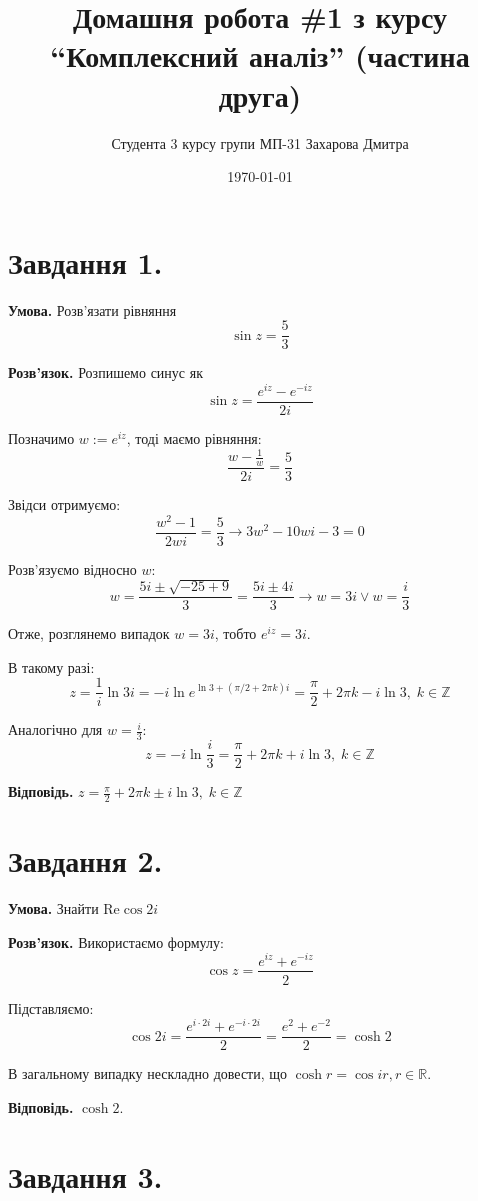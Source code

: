 \documentclass[12pt]{extarticle}
\title{Домашня робота \#1 з курсу ``Комплексний аналіз'' (частина друга)}
\author{Студента 3 курсу групи МП-31 Захарова Дмитра}
\date{\today}
\begin{document}
\maketitle

\section*{Завдання 1.} 

\textbf{Умова.} Розв'язати рівняння
\[
\sin z = \frac{5}{3}
\]

\textbf{Розв'язок.} Розпишемо синус як
\[
\sin z = \frac{e^{iz} - e^{-iz}}{2i}
\]

Позначимо $w := e^{iz}$, тоді маємо рівняння:
\[
\frac{w - \frac{1}{w}}{2i} = \frac{5}{3}
\]

Звідси отримуємо:
\[
\frac{w^2 - 1}{2wi} = \frac{5}{3} \to 3w^2 -10wi - 3 = 0
\]

Розв'язуємо відносно $w$:
\[
w = \frac{5i \pm \sqrt{-25 + 9}}{3} = \frac{5i \pm 4i}{3} \to w = 3i \vee w = \frac{i}{3}
\]

Отже, розглянемо випадок $w = 3i$, тобто $e^{iz}=3i$. 

В такому разі:
\[
z = \frac{1}{i}\ln 3i = -i \ln e^{\ln 3 + (\pi/2+2\pi k)i} = \frac{\pi}{2} + 2\pi k - i \ln 3, \; k \in \mathbb{Z}
\]

Аналогічно для $w=\frac{i}{3}$:
\[
z = -i \ln \frac{i}{3} = \frac{\pi}{2} + 2\pi k + i \ln 3, \; k \in \mathbb{Z}
\]

\textbf{Відповідь.} $z = \frac{\pi}{2} + 2\pi k \pm i \ln 3, \; k \in \mathbb{Z}$

\section*{Завдання 2.} 

\textbf{Умова.} Знайти $\text{Re} \cos 2i$

\textbf{Розв'язок.} Використаємо формулу:
\[
\cos z = \frac{e^{iz} + e^{-iz}}{2}
\]

Підставляємо:
\[
\cos 2i = \frac{e^{i \cdot 2i} + e^{-i \cdot 2i}}{2} = \frac{e^{2} + e^{-2}}{2} = \cosh 2
\]

В загальному випадку нескладно довести, що $\cosh r = \cos ir, r \in \mathbb{R}$.

\textbf{Відповідь.} $\cosh 2$.

\section*{Завдання 3.}
\end{document}
